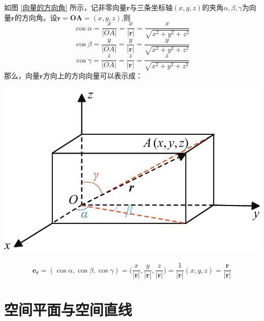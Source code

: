 \vspace*{0.5em}
\noindent
\begin{minipage}{0.55\linewidth}
\hspace*{2em}如图 \ref{向量的方向角} 所示，记非零向量$\boldsymbol{r}$与三条坐标轴$(x,y,z)$的夹角$\alpha,\beta,\gamma$为向量$\boldsymbol{r}$的方向角。设$\boldsymbol{r}=\boldsymbol{OA}=(x,y,z)$,则
\begin{equation}
	\cos \alpha=\frac{x}{|OA|}=\frac{x}{\boldsymbol{|r|}}=\frac{x}{\sqrt{x^2+y^2+z^2}}
\end{equation}
\begin{equation}
	\cos \beta=\frac{y}{|OA|}=\frac{y}{\boldsymbol{|r|}}=\frac{y}{\sqrt{x^2+y^2+z^2}}
\end{equation}
\begin{equation}
	\cos \gamma=\frac{z}{|OA|}=\frac{z}{\boldsymbol{|r|}}=\frac{z}{\sqrt{x^2+y^2+z^2}}
\end{equation}
那么，向量$\boldsymbol{r}$方向上的方向向量可以表示成：
\end{minipage}
\begin{minipage}{0.45\linewidth}
	\centering
	\includegraphics[width = 0.85\linewidth]{pic/C-5/vesang3}
	\vspace*{-1em}
	\label{向量的方向角}
\end{minipage}

\begin{equation}
	\boldsymbol{e_r}=(\cos \alpha,\cos \beta,\cos \gamma)=\bigg(\frac{x}{|\boldsymbol{r}|},\frac{y}{|\boldsymbol{r}|},\frac{z}{|\boldsymbol{r}|}\bigg)=\frac{1}{|\boldsymbol{r}|}(x,y,z)=\frac{\boldsymbol{r}}{|\boldsymbol{r}|}
\end{equation}
\section{空间平面与空间直线}
